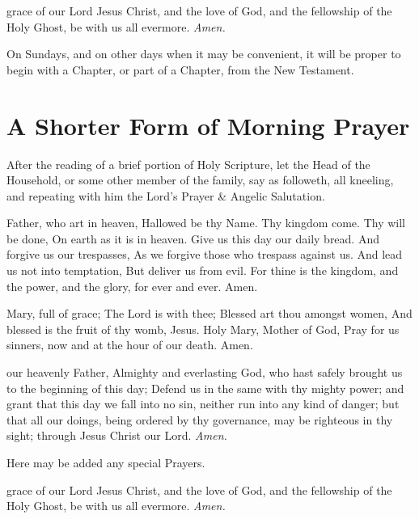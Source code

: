  grace of our Lord Jesus Christ, {} and the love of God, and the fellowship of the Holy Ghost, be with us all evermore. \textit{Amen.}


\begin{rubric}
    On Sundays, and on other days when it may be convenient, it will be proper to begin with a Chapter, or part of a Chapter, from the New Testament.
\end{rubric}


\section{A Shorter Form of Morning Prayer}
\begin{secrubric}
    After the reading of a brief portion of Holy Scripture, let the Head of the Household, or some other member of the family, say as followeth, all kneeling, and repeating with him the Lord's Prayer \& Angelic Salutation.
\end{secrubric}

 Father, who art in heaven, Hallowed be thy Name. Thy kingdom come. Thy will be done, On earth as it is in heaven. Give us this day our daily bread. And forgive us our trespasses, As we forgive those who trespass against us. And lead us not into temptation, But deliver us from evil. For thine is the kingdom, and the power, and the glory, for ever and ever. Amen.\par

 Mary, full of grace; The Lord is with thee; Blessed art thou amongst women, And blessed is the fruit of thy womb, Jesus. Holy Mary, Mother of God, Pray for us sinners, now and at the hour of our death. Amen.

 our heavenly Father, Almighty and everlasting God, who hast safely brought us to the beginning of this day; Defend us in the same with thy mighty power; and grant that this day we fall into no sin, neither run into any kind of danger; but that all our doings, being ordered by thy governance, may be righteous in thy sight; through Jesus Christ our Lord. \textit{Amen.}
\begin{rubric}
    Here may be added any special Prayers.
\end{rubric}

 grace of our Lord Jesus Christ, {} and the love of God, and the fellowship of the Holy Ghost, be with us all evermore. \textit{Amen.}
 
